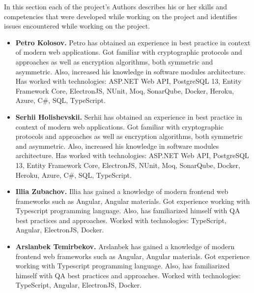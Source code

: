 In this section each of the project's Authors describes his or her skills and competencies that
were developed while working on the project and identifies issues encountered while working on the project.

\begin{itemize}
    \item \textbf{Petro Kolosov.} Petro has obtained an experience in best practice
    in context of modern web applications.
    Got familiar with cryptographic protocols and approaches as well as encryption algorithms,
    both symmetric and asymmetric.
    Also, increased his knowledge in software modules architecture.
    Has worked with technologies: ASP.NET Web API, PostgreSQL 13, Entity Framework Core, ElectronJS,
    NUnit, Moq, SonarQube, Docker, Heroku, Azure, C\#, SQL, TypeScript.
    \item \textbf{Serhii Holishevskii.} Serhii has obtained an experience in best practice
    in context of modern web applications.
    Got familiar with cryptographic protocols and approaches as well as encryption algorithms,
    both symmetric and asymmetric.
    Also, increased his knowledge in software modules architecture.
    Has worked with technologies: ASP.NET Web API, PostgreSQL 13, Entity Framework Core, ElectronJS,
    NUnit, Moq, SonarQube, Docker, Heroku, Azure, C\#, SQL, TypeScript.
    \item \textbf{Illia Zubachov.} Illia has gained a knowledge of modern frontend web frameworks such as
    Angular, Angular materials.
    Got experience working with Typescript programming language.
    Also, has familiarized himself with QA best practices and approaches.
    Worked with technologies: TypeScript, Angular, ElectronJS, Docker.
    \item \textbf{Arslanbek Temirbekov.} Arslanbek has gained a knowledge of modern frontend web frameworks such as
    Angular, Angular materials.
    Got experience working with Typescript programming language.
    Also, has familiarized himself with QA best practices and approaches.
    Worked with technologies: TypeScript, Angular, ElectronJS, Docker.
\end{itemize}